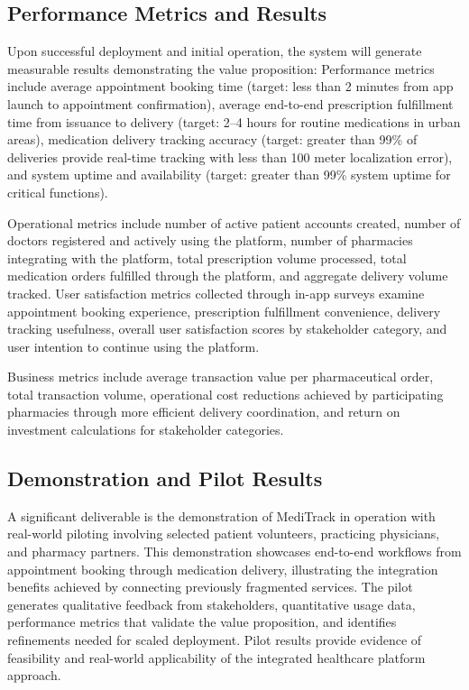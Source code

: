 \documentclass[12pt,a4paper]{report}
\begin{document}
\subsection{Performance Metrics and Results}

Upon successful deployment and initial operation, the system will generate measurable results demonstrating the value proposition: Performance metrics include average appointment booking time (target: less than 2 minutes from app launch to appointment confirmation), average end-to-end prescription fulfillment time from issuance to delivery (target: 2--4 hours for routine medications in urban areas), medication delivery tracking accuracy (target: greater than 99\% of deliveries provide real-time tracking with less than 100 meter localization error), and system uptime and availability (target: greater than 99\% system uptime for critical functions).

Operational metrics include number of active patient accounts created, number of doctors registered and actively using the platform, number of pharmacies integrating with the platform, total prescription volume processed, total medication orders fulfilled through the platform, and aggregate delivery volume tracked. User satisfaction metrics collected through in-app surveys examine appointment booking experience, prescription fulfillment convenience, delivery tracking usefulness, overall user satisfaction scores by stakeholder category, and user intention to continue using the platform.

Business metrics include average transaction value per pharmaceutical order, total transaction volume, operational cost reductions achieved by participating pharmacies through more efficient delivery coordination, and return on investment calculations for stakeholder categories.

\subsection{Demonstration and Pilot Results}

A significant deliverable is the demonstration of MediTrack in operation with real-world piloting involving selected patient volunteers, practicing physicians, and pharmacy partners. This demonstration showcases end-to-end workflows from appointment booking through medication delivery, illustrating the integration benefits achieved by connecting previously fragmented services. The pilot generates qualitative feedback from stakeholders, quantitative usage data, performance metrics that validate the value proposition, and identifies refinements needed for scaled deployment. Pilot results provide evidence of feasibility and real-world applicability of the integrated healthcare platform approach.
\end{document}
